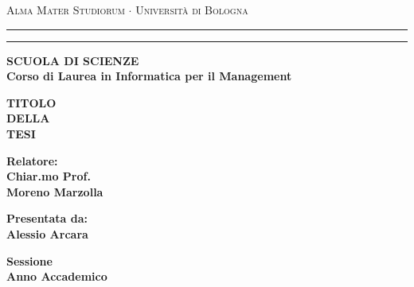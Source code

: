 \begin{titlepage}
\begin{center}
{{\Large{\textsc{Alma Mater Studiorum $\cdot$ Università di Bologna}}}} 
\rule[0.1cm]{15.8cm}{0.1mm}
\rule[0.5cm]{15.8cm}{0.6mm}
{\small{\bf SCUOLA DI SCIENZE\\
Corso di Laurea in Informatica per il Management }}
\end{center}
\vspace{15mm}
\begin{center}
{\LARGE{\bf TITOLO}}\\
\vspace{3mm}
{\LARGE{\bf DELLA}}\\
\vspace{3mm}
{\LARGE{\bf TESI}}\\
\end{center}
\vspace{40mm}
\par
\noindent
\begin{minipage}[t]{0.47\textwidth}
{\large{\bf Relatore:\\
Chiar.mo Prof.\\
Moreno Marzolla}}
\end{minipage}
\hfill
\begin{minipage}[t]{0.47\textwidth}\raggedleft
{\large{\bf Presentata da:\\
Alessio Arcara}}
\end{minipage}
\vspace{20mm}
\begin{center}
{\large{\bf Sessione\\%
Anno Accademico }}%
\end{center}
\end{titlepage}
\restoregeometry
